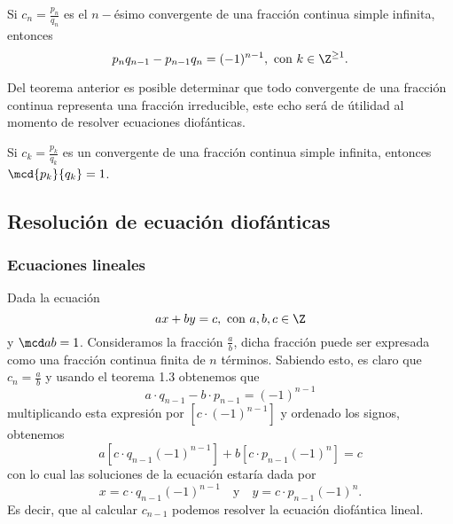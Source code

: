 \begin{theorem.box}{}{}
    Si $c_n = \frac{p_n}{q_n}$ es el $n-$ésimo convergente de una fracción continua simple infinita, entonces
    \[
        p_n q_{n - 1} - p_{n - 1}q_n = (- 1)^{n-1}, \ \text{con}\ k \in \Z^{\geq 1}.
    \]
\end{theorem.box}
Del teorema anterior es posible determinar que todo convergente de una fracción continua representa una fracción irreducible, este echo será de útilidad al momento de resolver ecuaciones diofánticas.
\begin{corollary}
    Si $c_k = \frac{p_k}{q_k}$ es un convergente de una fracción continua simple infinita, entonces $\mcd{p_k}{q_k} = 1$.
\end{corollary}



\subsection{Resolución de ecuación diofánticas}

\subsubsection{Ecuaciones lineales}

Dada la ecuación
\[
    ax + by = c,\ \text{con}\ a,b,c \in \Z
\]
y $\mcd a b = 1$.
Consideramos la fracción $\frac{a}{b}$, dicha fracción puede ser expresada como una fracción continua finita de $n$ términos.
Sabiendo esto, es claro que $c_n = \frac{a}{b}$ y usando el teorema 1.3 obtenemos que
\[
    a\cdot q_{n - 1} - b\cdot p_{n - 1} = (-1)^{n- 1}
\]
multiplicando esta expresión por $\left[c \cdot (-1)^{n - 1}\right]$ y ordenado los signos, obtenemos
\[
    a \left[c\cdot q_{n - 1} (-1)^{n - 1}\right] + b \left[c \cdot p_{n - 1} (-1)^n\right] = c
\]
con lo cual las soluciones de la ecuación estaría dada por
\[
    x = c \cdot q_{n - 1} (-1)^{n - 1} \quad \text{y} \quad y = c \cdot p_{n - 1} (-1)^{n}.
\]
Es decir, que al calcular $c_{n - 1}$ podemos resolver la ecuación diofántica lineal.

